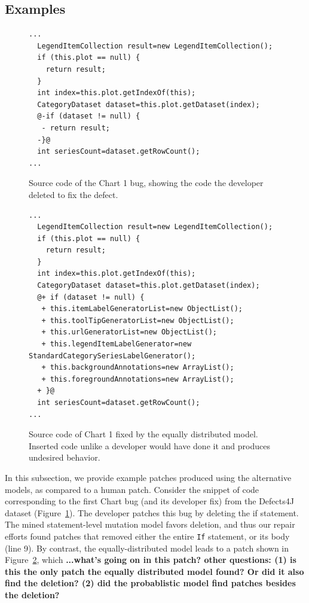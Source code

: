 \documentclass[conference]{IEEEtran}
\newcommand{\todo}[1]
  {{\scriptsize \textbf{\color{red} {#1}}}}
\begin{document}
\subsection{Examples} \label{examPatches}

\begin{figure}[t]
\begin{lstlisting}[frame=single,style=base]
...
  LegendItemCollection result=new LegendItemCollection();
  if (this.plot == null) {
    return result;
  }
  int index=this.plot.getIndexOf(this);
  CategoryDataset dataset=this.plot.getDataset(index);
  @-if (dataset != null) {
   - return result;
  -}@
  int seriesCount=dataset.getRowCount();
...
	\end{lstlisting}
	\caption{Source code of the Chart 1 bug, showing the code the developer
      deleted to fix the defect.\label{fig:chart1.1}}
\end{figure}

\begin{figure}[t]
\begin{lstlisting}[frame=single,style=base]
...
  LegendItemCollection result=new LegendItemCollection();
  if (this.plot == null) {
    return result;
  }
  int index=this.plot.getIndexOf(this);
  CategoryDataset dataset=this.plot.getDataset(index);
  @+ if (dataset != null) { 
   + this.itemLabelGeneratorList=new ObjectList();
   + this.toolTipGeneratorList=new ObjectList();
   + this.urlGeneratorList=new ObjectList();
   + this.legendItemLabelGenerator=new StandardCategorySeriesLabelGenerator();
   + this.backgroundAnnotations=new ArrayList();
   + this.foregroundAnnotations=new ArrayList();
  + }@
  int seriesCount=dataset.getRowCount();
...
	\end{lstlisting}
	\caption{Source code of Chart 1 fixed by the equally distributed model. Inserted code unlike a developer would have done it and produces undesired behavior.	\label{fig:chart1.3}}

\end{figure}


In this subsection, we provide example patches produced using the alternative
models, as compared to a human patch.  Consider the snippet of code corresponding
to the first Chart bug (and its developer fix) from the Defects4J dataset
(Figure~\ref{fig:chart1.1}).  The developer patches this bug by deleting the if
statement.  The mined statement-level mutation model favors deletion, and thus
our repair efforts found patches that removed either the entire \texttt{If} statement, or its body (line 9).
By contrast, the equally-distributed model leads to a patch shown in
Figure~\ref{fig:chart1.3}, which \todo{...what's going on in this patch? other
  questions: (1) is this the only patch the equally distributed model 
  found?  Or did it also find the deletion? (2) did the probablistic model find patches besides the deletion?}
\end{document}
